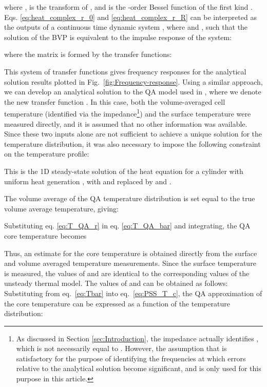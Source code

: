 \documentclass[journal, english]{IEEEtran}
\begin{document}
where ,  is the transform of ,
and  is the -order Bessel function of the first kind \cite{Kreyszig2010}. Eqs. \ref{eq:heat_complex_r_0} and \ref{eq:heat_complex_r_R} can be interpreted as the outputs of a continuous time dynamic system \cite{Muratori2010a}, where  and ,
such that the solution of the BVP is equivalent to the impulse response
of the system:

where the  matrix is formed by the transfer functions:

This system of transfer
functions gives frequency responses for the analytical solution results
plotted in Fig.\ \ref{fig:Frequency-response}. Using a similar approach, we
can develop an analytical solution to the
QA model used in \cite{Richardson2014}, where we denote the new transfer
function . In this case, both the volume-averaged cell
temperature (identified via the impedance\footnote{As discussed in Section \ref{sec:Introduction}, the impedance actually
identifies , which is not necessarily equal to
. However, the assumption that 
is satisfactory for the purpose of identifying the frequencies at
which errors relative to the analytical solution become significant, and is only used for this purpose in this article.}) and the surface temperature
were measured directly, and it is assumed that no other information
was available. Since these two inputs alone are not sufficient to
achieve a unique solution for the temperature distribution, it was
also necessary to impose the following constraint on the temperature
profile:

This is the 1D steady-state solution of the heat equation
for a cylinder with uniform heat generation \cite{Incropera2007a},
with  and  replaced by  and . 

The volume average of the QA temperature distribution is set equal to the true volume average temperature, giving:

Substituting eq. \ref{eq:T_QA_r} in eq. \ref{eq:T_QA_bar} and integrating, the QA core temperature
becomes

Thus, an estimate for the core temperature is obtained directly from
the surface and volume averaged temperature measurements.
Since the surface temperature is measured, the values of 
and  are identical to the corresponding
values of the unsteady thermal model. The values of 
and  can be obtained as follows: 
Substituting  from eq.\ \ref{eq:Tbar} into eq.\ \ref{eq:PSS_T_c}, the QA approximation of the core temperature can be expressed as a function of the temperature distribution:
\end{document}
